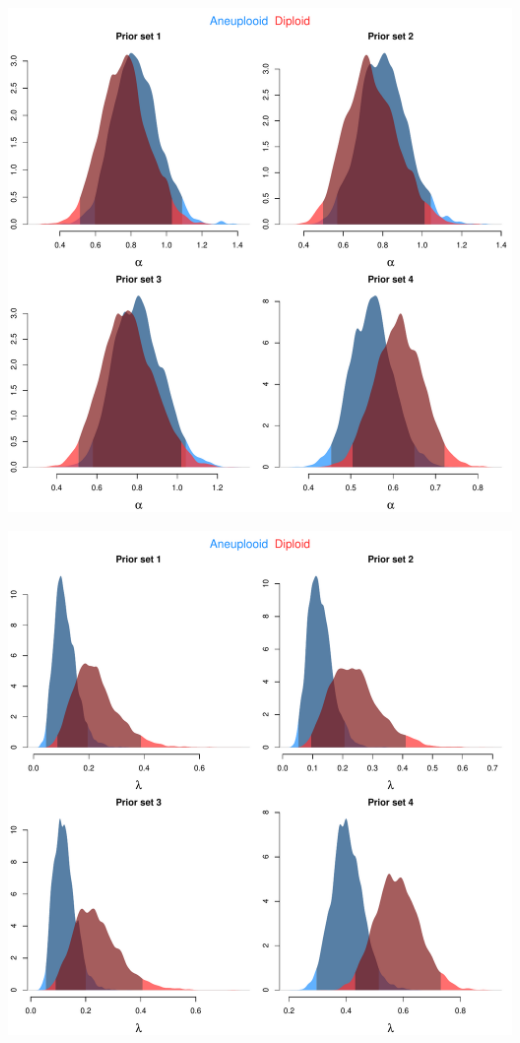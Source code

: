 \documentclass[12pt]{article}
\begin{document}
\begin{center}
\includegraphics[scale=0.50]{a_sens_alpha.pdf}
\bigskip
\bigskip

\includegraphics[scale=0.50]{a_sens_lambda.pdf}
\end{center}
\end{document}
